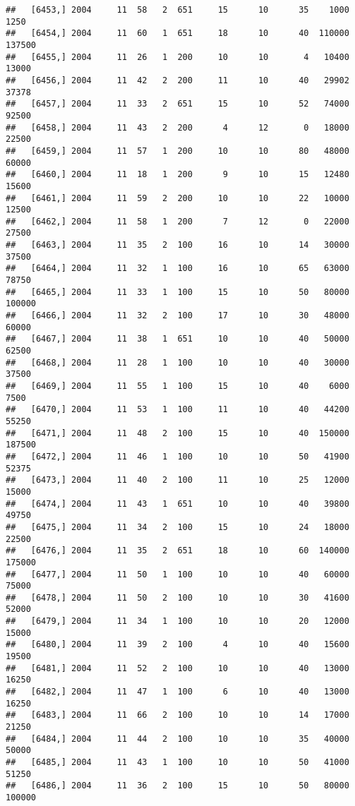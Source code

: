 \documentclass{article}\usepackage[]{graphicx}\usepackage[]{color}
\makeatletter
\newenvironment{kframe}{%
 \def\at@end@of@kframe{}%
 \ifinner\ifhmode%
  \def\at@end@of@kframe{\end{minipage}}%
  \begin{minipage}{\columnwidth}%
 \fi\fi%
 \def\FrameCommand##1{\hskip\@totalleftmargin \hskip-\fboxsep
 \colorbox{shadecolor}{##1}\hskip-\fboxsep
     \hskip-\linewidth \hskip-\@totalleftmargin \hskip\columnwidth}%
 \MakeFramed {\advance\hsize-\width
   \@totalleftmargin\z@ \linewidth\hsize
   \@setminipage}}%
 {\par\unskip\endMakeFramed%
 \at@end@of@kframe}
\newenvironment{knitrout}{}{} %
\makeatother
\begin{document}
\begin{knitrout}
\begin{kframe}
\begin{verbatim}
##   [6453,] 2004     11  58   2  651     15      10      35    1000    1250
##   [6454,] 2004     11  60   1  651     18      10      40  110000  137500
##   [6455,] 2004     11  26   1  200     10      10       4   10400   13000
##   [6456,] 2004     11  42   2  200     11      10      40   29902   37378
##   [6457,] 2004     11  33   2  651     15      10      52   74000   92500
##   [6458,] 2004     11  43   2  200      4      12       0   18000   22500
##   [6459,] 2004     11  57   1  200     10      10      80   48000   60000
##   [6460,] 2004     11  18   1  200      9      10      15   12480   15600
##   [6461,] 2004     11  59   2  200     10      10      22   10000   12500
##   [6462,] 2004     11  58   1  200      7      12       0   22000   27500
##   [6463,] 2004     11  35   2  100     16      10      14   30000   37500
##   [6464,] 2004     11  32   1  100     16      10      65   63000   78750
##   [6465,] 2004     11  33   1  100     15      10      50   80000  100000
##   [6466,] 2004     11  32   2  100     17      10      30   48000   60000
##   [6467,] 2004     11  38   1  651     10      10      40   50000   62500
##   [6468,] 2004     11  28   1  100     10      10      40   30000   37500
##   [6469,] 2004     11  55   1  100     15      10      40    6000    7500
##   [6470,] 2004     11  53   1  100     11      10      40   44200   55250
##   [6471,] 2004     11  48   2  100     15      10      40  150000  187500
##   [6472,] 2004     11  46   1  100     10      10      50   41900   52375
##   [6473,] 2004     11  40   2  100     11      10      25   12000   15000
##   [6474,] 2004     11  43   1  651     10      10      40   39800   49750
##   [6475,] 2004     11  34   2  100     15      10      24   18000   22500
##   [6476,] 2004     11  35   2  651     18      10      60  140000  175000
##   [6477,] 2004     11  50   1  100     10      10      40   60000   75000
##   [6478,] 2004     11  50   2  100     10      10      30   41600   52000
##   [6479,] 2004     11  34   1  100     10      10      20   12000   15000
##   [6480,] 2004     11  39   2  100      4      10      40   15600   19500
##   [6481,] 2004     11  52   2  100     10      10      40   13000   16250
##   [6482,] 2004     11  47   1  100      6      10      40   13000   16250
##   [6483,] 2004     11  66   2  100     10      10      14   17000   21250
##   [6484,] 2004     11  44   2  100     10      10      35   40000   50000
##   [6485,] 2004     11  43   1  100     10      10      50   41000   51250
##   [6486,] 2004     11  36   2  100     15      10      50   80000  100000

\end{verbatim}
\end{kframe}
\end{knitrout}
\end{document}
